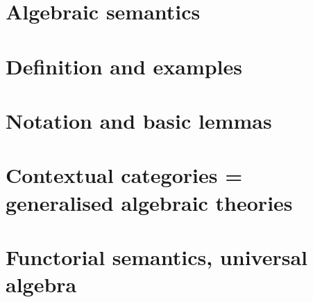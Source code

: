 
\section{Algebraic semantics} \label{sec:source-2-1}

\lipsum[14]

\section{Definition and examples} \label{sec:source-2-2}

\lipsum[15]

\section{Notation and basic lemmas} \label{sec:source-2-3}

\lipsum[16]

\section{Contextual categories = generalised algebraic theories} \label{sec:source-2-4}

\lipsum[17]

\section{Functorial semantics, universal algebra} \label{sec:source-2-5}

\lipsum[18]

